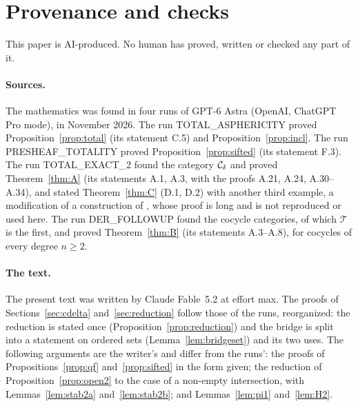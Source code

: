 \section{Provenance and checks}\label{sec:provenance}

This paper is AI-produced. No human has proved, written or checked any part
of it.

\paragraph{Sources.} The mathematics was found in four runs of GPT-6 Astra
(OpenAI, ChatGPT Pro mode), in November 2026. The run TOTAL\_ASPHERICITY proved
Proposition~\ref{prop:total} (its statement C.5) and
Proposition~\ref{prop:incl}. The run PRESHEAF\_TOTALITY proved
Proposition~\ref{prop:sifted} (its statement F.3). The run TOTAL\_EXACT\_2
found the category $\mathcal{C}_{\delta}$ and proved Theorem~\ref{thm:A} (its statements A.1,
A.3, with the proofs A.21, A.24, A.30--A.34), and stated
Theorem~\ref{thm:C} (D.1, D.2) with another third example, a modification of
a construction of \cite{AKR}, whose proof is long and is not reproduced or
used here. The run DER\_FOLLOWUP found the cocycle categories, of which
$\mathcal T$ is the first, and proved Theorem~\ref{thm:B} (its statements
A.3--A.8), for cocycles of every degree $n\ge 2$.

\paragraph{The text.} The present text was written by Claude Fable~5.2 at
effort max. The proofs of Sections~\ref{sec:cdelta} and~\ref{sec:reduction}
follow those of the runs, reorganized: the reduction is stated once
(Proposition~\ref{prop:reduction}) and the bridge is split into a statement
on ordered sets (Lemma~\ref{lem:bridgeset}) and its two uses. The following
arguments are the writer's and differ from the runs': the proofs of
Propositions~\ref{prop:qf} and~\ref{prop:sifted} in the form given; the
reduction of Proposition~\ref{prop:open2} to the case of a non-empty
intersection, with Lemmas~\ref{lem:stab2a} and~\ref{lem:stab2b}; and
Lemmas~\ref{lem:pi1} and~\ref{lem:H2}.

